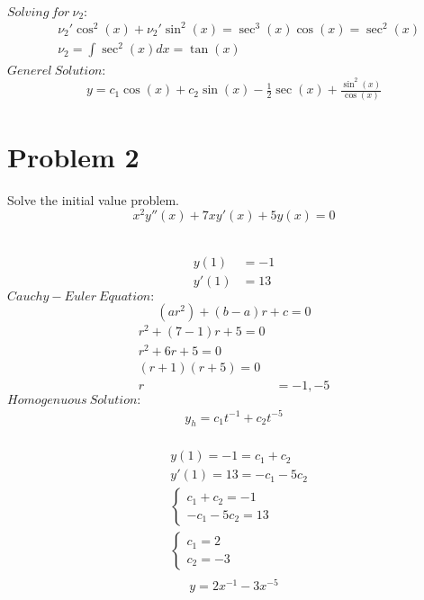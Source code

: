\documentclass{article}
\begin{document}
    $Solving\ for\ \nu_2:$ \\   
    \begin{align*}
        &\nu_2'\cos^{2}(x) + \nu_2'\sin^{2}(x) = \sec^{3}(x)\cos(x) = \sec^{2}(x)\\
        &\nu_2 = \int \sec^{2}(x)dx = \tan(x) \\
    \end{align*}
    $Generel\ Solution:$ \\
    \begin{align*}
        y = c_{1}\cos(x) + c_{2}\sin(x) - \frac{1}{2}\sec(x) + \frac{\sin^{2}(x)}{\cos(x)}
    \end{align*}

    \newpage
    \section{Problem 2}

    \begin{flushleft}
        Solve the initial value problem. \\
        $$x^{2}y''(x) + 7xy'(x) + 5y(x) = 0$$
    \end{flushleft} 
     \\
    \begin{align*}
        y(1) &= -1 \\
        y'(1) &= 13
    \end{align*}
    $Cauchy-Euler\ Equation:$ \\
    $$(ar^2) + (b - a)r + c = 0$$
    \begin{align*}
        r^{2} + (7 - 1)r + 5 = 0 \\
        r^{2} + 6r + 5 = 0 \\
        (r + 1)(r + 5) = 0 \\
        r &= -1, -5
    \end{align*}
    $Homogenuous\ Solution:$ \\
    \begin{align*}
        y_h = c_{1}t^{-1} + c_{2}t^{-5}
    \end{align*}
     \\
    \begin{align*}
        &y(1) = -1 = c_{1} + c_{2} \\
        &y'(1) = 13 = -c_{1} - 5c_{2} \\
        &\begin{cases}
            c_{1} + c_{2} = -1 \\
            -c_{1} - 5c_{2} = 13
        \end{cases} \\
        &\begin{cases}
            c_{1} = 2 \\
            c_{2} = -3
        \end{cases} \\
    \end{align*}
    $$y = 2x^{-1} - 3x^{-5}$$
\end{document}
